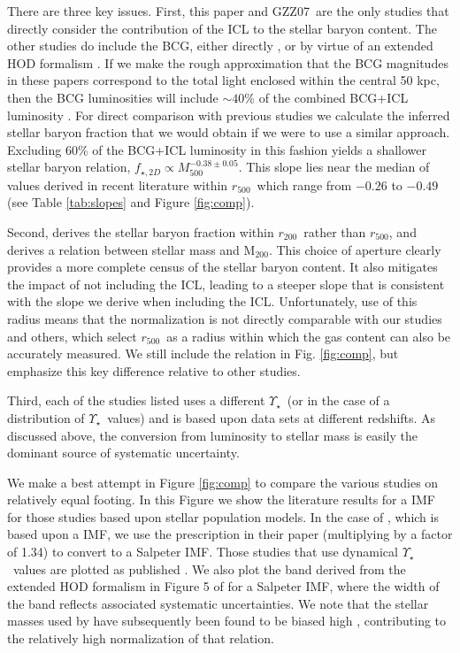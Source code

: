 \documentclass[preprint]{emulateapj}
\newcommand\rfive{$r_{500}$}
\newcommand\rtwo{$r_{200}$}
\newcommand\ptwo{GZZ07}
\newcommand\mtwo{M$_{200}$}
\newcommand{\mlrat}{$\Upsilon_\star$}
\begin{document}
There are three key issues. 
First, this paper and \ptwo\ are the only studies that directly
consider the contribution of the ICL to the stellar baryon content.
The other studies do include the BCG, either directly
\citep{lin2003,giodini2009,andreon2010,lagana2011,zhang2011,lin2012},
or by virtue of an extended HOD formalism \citep{leauthaud2012}. If we
make the rough approximation that the BCG magnitudes in these papers
correspond to the total light enclosed within the central 50 kpc, then
the BCG luminosities will include $\sim40$\% of the combined BCG+ICL
luminosity \citep{gonzalez2005}. For direct comparison with previous
studies we calculate the inferred stellar baryon fraction that we
would obtain if we were to use a similar approach. Excluding 60\% of
the BCG+ICL luminosity in this fashion yields a shallower stellar
baryon relation, $f_{\star,2D}\propto
M_{500}^{-0.38\pm0.05}$. 
This slope lies near the median of values derived in recent literature
within \rfive\, which range from $-0.26$ to $-0.49$ (see Table
\ref{tab:slopes} and Figure \ref{fig:comp}).

Second, \citet{andreon2010} derives the stellar baryon fraction within
\rtwo\ rather than \rfive, and derives a relation between stellar mass
and \mtwo.  This choice of aperture clearly provides a more complete
census of the stellar baryon content. It also mitigates the impact of
not including the ICL, leading to a steeper slope that is consistent
with the 
slope we derive when including the ICL. Unfortunately, use of this
radius means that the normalization is not directly comparable with
our studies and others, which select \rfive\ as a radius within which
the gas content can also be accurately measured.  We still include the
\citet{andreon2010} relation in Fig. \ref{fig:comp}, but emphasize
this key difference relative to other studies.

Third, each of the studies listed uses a different \mlrat\ (or in the
case of \citet{leauthaud2012} a distribution of \mlrat\ values) and is
based upon data sets at different redshifts. As discussed above, the
conversion from luminosity to stellar mass is easily the dominant
source of systematic uncertainty.

We make a best attempt in Figure \ref{fig:comp} to compare the various
studies on relatively equal footing. In this Figure we show the
literature results for a \citet{salpeter1955} IMF for those studies
based upon stellar population models. In the case of \citet{lin2012},
which is based upon a \citet{kroupa2001} IMF, we use the prescription
in their paper (multiplying by a factor of 1.34) to convert to a
Salpeter IMF.
Those studies that use dynamical \mlrat\ values are plotted as
published \citep{lin2003,gonzalez2007,andreon2010}. We also plot the
band derived from the extended HOD formalism in Figure 5 of
\citet{leauthaud2012} for a Salpeter IMF, where the width of the band
reflects associated systematic uncertainties. 
We note that the stellar masses used by \citet{giodini2009} have subsequently
been found to be biased high \citep{leauthaud2012,giodini2012},
contributing to the relatively high normalization of that relation.
\end{document}
